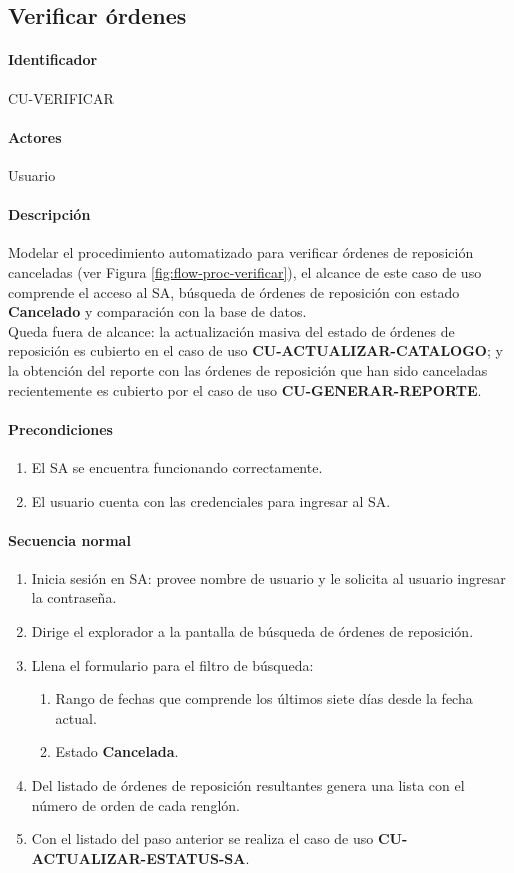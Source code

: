 \subsection{Verificar órdenes}
\paragraph*{Identificador}
CU-VERIFICAR
\paragraph*{Actores}
Usuario
\paragraph*{Descripción}
Modelar el procedimiento automatizado para verificar órdenes de reposición canceladas (ver Figura \ref{fig:flow-proc-verificar}), el alcance de este caso de uso comprende el acceso al SA, búsqueda de órdenes de reposición con estado \textbf{Cancelado} y comparación con la base de datos.\\
Queda fuera de alcance: la actualización masiva del estado de órdenes de reposición es cubierto en el caso de uso \textbf{CU-ACTUALIZAR-CATALOGO}; y la obtención del reporte con las órdenes de reposición que han sido canceladas recientemente es cubierto por el caso de uso \textbf{CU-GENERAR-REPORTE}.
\paragraph*{Precondiciones}
\begin{enumerate}
  \item El SA se encuentra funcionando correctamente.
  \item El usuario cuenta con las credenciales para ingresar al SA.
\end{enumerate}
\paragraph*{Secuencia normal}
\begin{enumerate}
  \item Inicia sesión en SA: provee nombre de usuario y le solicita al usuario ingresar la contraseña.
  \item Dirige el explorador a la pantalla de búsqueda de órdenes de reposición.
  \item Llena el formulario para el filtro de búsqueda:
  \begin{enumerate}
    \item Rango de fechas que comprende los últimos siete días desde la fecha actual.
    \item Estado \textbf{Cancelada}.
  \end{enumerate}
  \item Del listado de órdenes de reposición resultantes genera una lista con el número de orden de cada renglón.
  \item Con el listado del paso anterior se realiza el caso de uso \textbf{CU-ACTUALIZAR-ESTATUS-SA}.
\end{enumerate}
